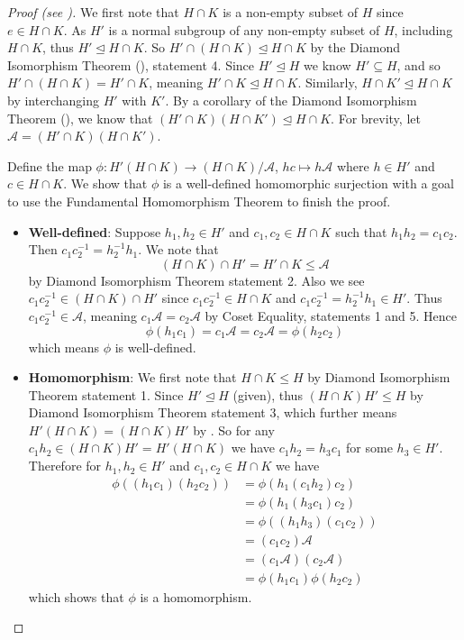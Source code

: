 \begin{proof}[Proof (see {\cite[Lemma I.8.9]{hungerford_1980}})]
    We first note that $H \cap K$ is a non-empty subset of $H$ since $e \in H \cap K$. As $H'$ is a normal subgroup of any non-empty subset of $H$, including $H \cap K$, thus $H' \unlhd H \cap K$. So $H' \cap (H \cap K) \unlhd H \cap K$ by the Diamond Isomorphism Theorem (), statement 4. Since $H'\unlhd H$ we know $H' \subseteq H$, and so $H' \cap (H \cap K) = H' \cap K$, meaning $H' \cap K \unlhd H \cap K$. Similarly, $H \cap K' \unlhd H \cap K$ by interchanging $H'$ with $K'$. By a corollary of the Diamond Isomorphism Theorem (), we know that $(H' \cap K)(H \cap K') \unlhd H \cap K$. For brevity, let $\mathcal{A} = (H' \cap K)(H \cap K')$.
    
    Define the map $\phi: H'(H\cap K) \to (H\cap K)/\mathcal{A}$, $hc \mapsto h\mathcal{A}$ where $h \in H'$ and $c \in H \cap K$. We show that $\phi$ is a well-defined homomorphic surjection with a goal to use the Fundamental Homomorphism Theorem to finish the proof.

    \begin{itemize}
        \item \textbf{Well-defined}: Suppose $h_1, h_2 \in H'$ and $c_1, c_2 \in H \cap K$ such that $h_1h_2 = c_1c_2$. Then $c_1c_2^{-1} = h_2^{-1}h_1$. We note that
        \[
            (H \cap K) \cap H' = H' \cap K \leq \mathcal{A}    
        \]
        by Diamond Isomorphism Theorem statement 2. Also we see $c_1c_2^{-1} \in (H \cap K) \cap H'$ since $c_1c_2^{-1} \in H \cap K$ and $c_1c_2^{-1} = h_2^{-1}h_1 \in H'$. Thus $c_1c_2^{-1} \in \mathcal{A}$, meaning $c_1\mathcal{A} = c_2\mathcal{A}$ by Coset Equality, statements 1 and 5. Hence
        \[
            \phi(h_1c_1) = c_1\mathcal{A} = c_2\mathcal{A} = \phi(h_2c_2)        
        \]
        which means $\phi$ is well-defined.
        
        \item \textbf{Homomorphism}: We first note that $H \cap K \leq H$ by Diamond Isomorphism Theorem statement 1. Since $H' \unlhd H$ (given), thus $(H\cap K)H' \leq H$ by Diamond Isomorphism Theorem statement 3, which further means $H'(H\cap K) = (H\cap K)H'$ by . So for any $c_1h_2 \in (H\cap K)H' = H'(H\cap K)$ we have $c_1h_2 = h_3c_1$ for some $h_3 \in H'$. Therefore for $h_1, h_2 \in H'$ and $c_1, c_2 \in H \cap K$ we have
        \begin{align*}
            \phi((h_1c_1)(h_2c_2)) &= \phi(h_1(c_1h_2)c_2)\\
            &= \phi(h_1(h_3c_1)c_2)\\
            &= \phi((h_1h_3)(c_1c_2))\\
            &= (c_1c_2)\mathcal{A}\\
            &= (c_1\mathcal{A})(c_2\mathcal{A})\\
            &= \phi(h_1c_1)\phi(h_2c_2)
        \end{align*}
        which shows that $\phi$ is a homomorphism.
        

\end{itemize}
\end{proof}
